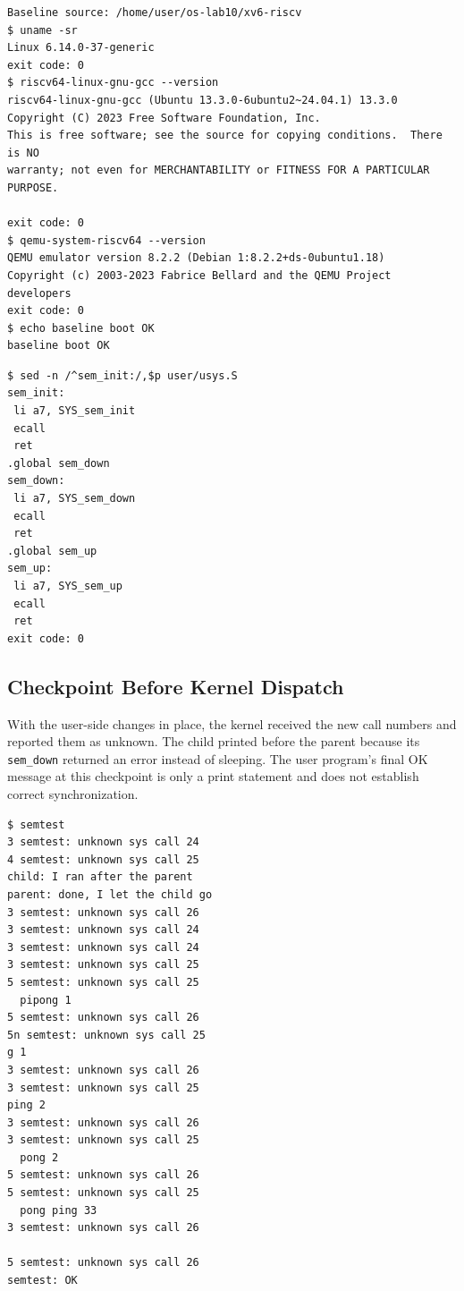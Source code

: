 \documentclass[12pt,a4paper]{article}
\begin{document}
\begin{lstlisting}[caption={Tool versions and baseline QEMU shell check}]
Baseline source: /home/user/os-lab10/xv6-riscv
$ uname -sr
Linux 6.14.0-37-generic
exit code: 0
$ riscv64-linux-gnu-gcc --version
riscv64-linux-gnu-gcc (Ubuntu 13.3.0-6ubuntu2~24.04.1) 13.3.0
Copyright (C) 2023 Free Software Foundation, Inc.
This is free software; see the source for copying conditions.  There is NO
warranty; not even for MERCHANTABILITY or FITNESS FOR A PARTICULAR PURPOSE.

exit code: 0
$ qemu-system-riscv64 --version
QEMU emulator version 8.2.2 (Debian 1:8.2.2+ds-0ubuntu1.18)
Copyright (c) 2003-2023 Fabrice Bellard and the QEMU Project developers
exit code: 0
$ echo baseline boot OK
baseline boot OK
\end{lstlisting}

\begin{lstlisting}[caption={Generated RISC-V stubs load the call number in a7 and execute ecall}]
$ sed -n /^sem_init:/,$p user/usys.S
sem_init:
 li a7, SYS_sem_init
 ecall
 ret
.global sem_down
sem_down:
 li a7, SYS_sem_down
 ecall
 ret
.global sem_up
sem_up:
 li a7, SYS_sem_up
 ecall
 ret
exit code: 0
\end{lstlisting}

\subsection{Checkpoint Before Kernel Dispatch}
With the user-side changes in place, the kernel received the new call numbers
and reported them as unknown. The child printed before the parent because its
\texttt{sem\_down} returned an error instead of sleeping. The user program's
final OK message at this checkpoint is only a print statement and does not
establish correct synchronization.

\begin{lstlisting}[caption={Actual QEMU transcript before installing the handlers}]
$ semtest
3 semtest: unknown sys call 24
4 semtest: unknown sys call 25
child: I ran after the parent
parent: done, I let the child go
3 semtest: unknown sys call 26
3 semtest: unknown sys call 24
3 semtest: unknown sys call 24
3 semtest: unknown sys call 25
5 semtest: unknown sys call 25
  pipong 1
5 semtest: unknown sys call 26
5n semtest: unknown sys call 25
g 1
3 semtest: unknown sys call 26
3 semtest: unknown sys call 25
ping 2
3 semtest: unknown sys call 26
3 semtest: unknown sys call 25
  pong 2
5 semtest: unknown sys call 26
5 semtest: unknown sys call 25
  pong ping 33
3 semtest: unknown sys call 26

5 semtest: unknown sys call 26
semtest: OK
\end{lstlisting}
\end{document}
